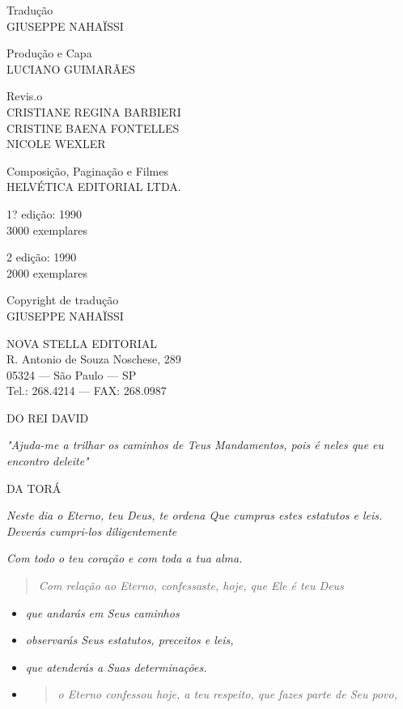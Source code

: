 Tradução\\
GIUSEPPE NAHAÏSSI

Produção e Capa\\
LUCIANO GUIMARÃES

Revis.o\\
CRISTIANE REGINA BARBIERI\\
CRISTINE BAENA FONTELLES\\
NICOLE WEXLER

Composição, Paginação e Filmes\\
HELVÉTICA EDITORIAL LTDA.

1? edição: 1990\\
3000 exemplares

2 edição: 1990\\
2000 exemplares

Copyright de tradução\\
GIUSEPPE NAHAÏSSI

NOVA STELLA EDITORIAL\\
R. Antonio de Souza Noschese, 289\\
05324 --- São Paulo --- SP\\
Tel.: 268.4214 --- FAX: 268.0987

DO REI DAVID

\emph{"Ajuda-me a trilhar os caminhos de Teus Man­damentos, pois é neles
que eu encontro deleite"}

DA TORÁ

\emph{Neste dia o Eterno, teu Deus, te ordena Que cumpras estes
estatutos e leis. Deverás cumpri-los diligentemente}

\emph{Com todo o teu coração e com toda a tua alma.}

\begin{quote}
\emph{Com relação ao Eterno, confessaste, hoje, que Ele é teu Deus}
\end{quote}

\begin{itemize}
\item
 \emph{que andarás em Seus caminhos}
\item
 \emph{observarás Seus estatutos, preceitos e leis,}
\item
 \emph{que atenderás a Suas determinações.}
\item
 \begin{quote}
 \emph{o Eterno confessou hoje, a teu respeito, que fazes parte de Seu
 povo,}
 \end{quote}
\end{itemize}

